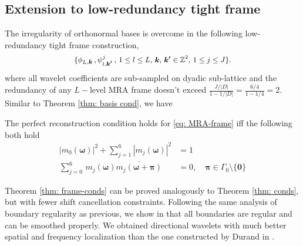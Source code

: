 \subsection{Extension to low-redundancy tight frame}\label{sec: frame}
The irregularity of orthonormal bases is overcome in the following low-redundancy tight frame construction,
 \begin{align}\label{eq: MRA-frame}
 \{\phi_{L,\boldsymbol{k}}\,,\psi^j_{l,\boldsymbol{k'}}\,, \, {\small 1\leq l \leq L,\, \boldsymbol{k},\,\boldsymbol{k'}\in \mathbb{Z}^2,\,1\leq j \leq J\}}.
\end{align}  
where all wavelet coefficients are sub-sampled on dyadic sub-lattice and the redundancy of any $L-$level MRA frame doesn't exceed $\frac{J/|D|}{1-1/|D|} = \frac{6/4}{1-1/4} = 2$.
Similar to Theorem \ref{thm: basis cond}, we have
\begin{thm}\label{thm: frame-conds}
The perfect reconstruction condition holds for \eqref{eq: MRA-frame} iff the following both hold
\begin{align}
\textstyle |m_0(\boldsymbol{\omega})|^2 + \sum_{j = 1}^6|m_j(\boldsymbol{\omega})|^2 &= 1 \\
\textstyle\sum_{j = 0}^6\,m_j(\boldsymbol{\omega})\overline{m_j(\boldsymbol{\omega} + \boldsymbol{\pi})} &= 0,\quad  \boldsymbol{\pi}\in \Gamma_0\setminus\{\boldsymbol{0}\} \label{eq: reduced-shift-cancel}
\end{align}
\end{thm}
Theorem \ref{thm: frame-conds} can be proved analogously to Theorem \ref{thm: conds}, 
but with fewer shift cancellation constraints. Following the same analysis of boundary regularity as previous, we show in \cite{yin2014orthshear} that all boundaries are regular and can be smoothed properly. We obtained directional wavelets with much better spatial and frequency localization than the one constructed by Durand in \cite{durand2007}. 
